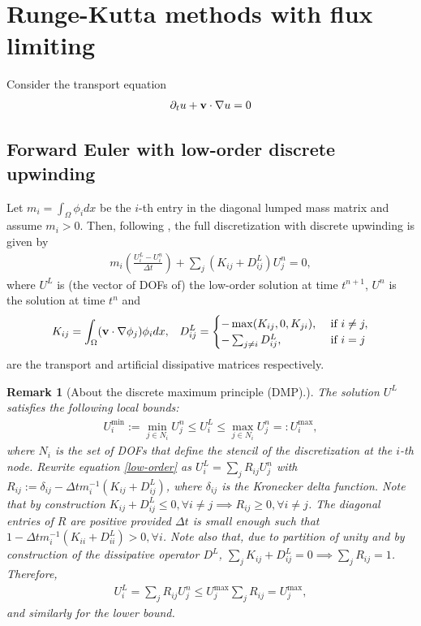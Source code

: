 \documentclass{article}
\newtheorem{remark}{Remark}
\numberwithin{remark}{subsection}
\newcommand{\bfv}{{\bf v}}
\begin{document}
\clearpage
\section{Runge-Kutta methods with flux limiting}
Consider the transport equation
\begin{align}\label{transport_equation}
  \partial_t u + \bfv\cdot \nabla u = 0
\end{align}

\subsection{Forward Euler with low-order discrete upwinding}\label{sec:FE_discUpwind}

Let $m_i=\int_\Omega \phi_i dx$ be the $i$-th entry in the diagonal lumped mass matrix
and assume $m_i>0$.
Then, following \cite{kuzmin2012flux},
the full discretization with discrete upwinding is given by
\begin{align}\label{low-order}
  m_i\left(\frac{U_i^L-U_i^n}{\Delta t}\right)+\sum_j\left(K_{ij}+D_{ij}^L\right)U_j^n=0,
\end{align}
where $U^L$ is (the vector of DOFs of) the low-order solution at time $t^{n+1}$,
$U^n$ is the solution at time $t^n$ and 
\begin{align}\label{transport_and_discUpwinding_matrices}
  K_{ij} = \int_\Omega (\bfv\cdot\nabla \phi_j) \phi_i dx,
  & &
  D^L_{ij} =
  \begin{cases}
    -\max(K_{ij},0,K_{ji}), & \text{ if } i\neq j, \\
    -\sum_{j\neq i} D_{ij}^L, & \text{ if } i=j
  \end{cases}
\end{align}
are the transport and artificial dissipative matrices respectively.

\begin{remark}[About the discrete maximum principle (DMP).]
  The solution $U^L$ satisfies the following local bounds:
  \begin{align}\label{local-bounds}
    U_i^{\min}:= \min_{j\in N_i} U_j^n \leq U_i^L \leq \max_{j\in N_i} U_j^n=:U_i^{\max},
  \end{align}
  where $N_i$ is the set of DOFs that define the stencil of the discretization at the $i$-th node.
  Rewrite equation \eqref{low-order} as $U_i^L=\sum_j R_{ij}U_j^n$ with
  $R_{ij}:=\delta_{ij}-\Delta t m_i^{-1} (K_{ij}+D_{ij}^L)$, where $\delta_{ij}$ is
  the Kronecker delta function. Note that by construction
  $K_{ij}+D^L_{ij}\leq 0, \forall i\neq j\implies R_{ij}\geq 0, \forall i\neq j$.
  The diagonal entries of $R$ are positive provided $\Delta t$ is small
  enough such that $1-\Delta t m_i^{-1}(K_{ii}+D_{ii}^L)>0, \forall i$. 
  Note also that, due to partition of unity and by construction of the dissipative operator $D^L$,
  $\sum_j K_{ij}+D^L_{ij}=0\implies \sum_j R_{ij}=1$. Therefore,
  \begin{align*}
    U_i^L=\sum_j R_{ij}U_j^n\leq U_j^{\max}\sum_j R_{ij} = U_j^{\max},
  \end{align*}
  and similarly for the lower bound.
\end{remark}
\end{document}
